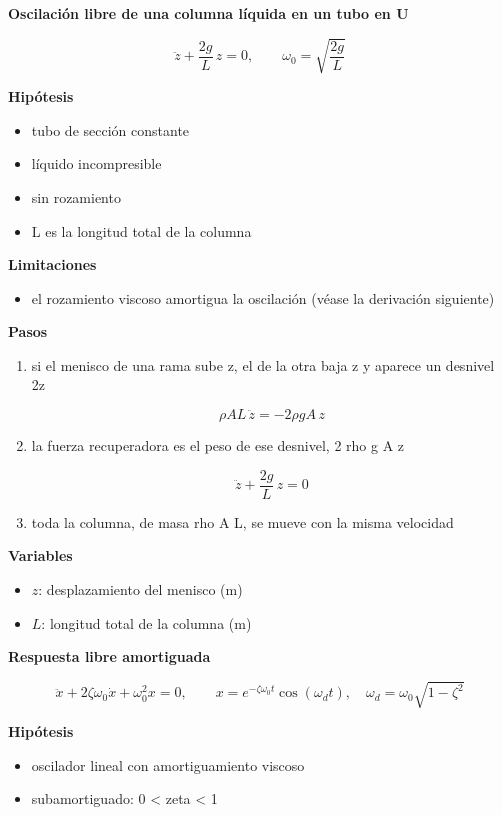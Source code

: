 \documentclass[10pt,openany]{book}
\begin{document}
\begin{tcolorbox}[title={Desarrollos del modelo}, studiumdef, breakable]

\noindent\textbf{Oscilación libre de una columna líquida en un tubo en U}

\[
\ddot z + \frac{2g}{L}\,z = 0,\qquad \omega_0 = \sqrt{\frac{2g}{L}}
\]

\noindent\textbf{Hipótesis}
\begin{itemize}
\item tubo de sección constante
\item líquido incompresible
\item sin rozamiento
\item L es la longitud total de la columna
\end{itemize}

\noindent\textbf{Limitaciones}
\begin{itemize}
\item el rozamiento viscoso amortigua la oscilación (véase la derivación siguiente)
\end{itemize}

\noindent\textbf{Pasos}
\begin{enumerate}
\item
si el menisco de una rama sube z, el de la otra baja z y aparece un desnivel 2z

\[
\rho A L\,\ddot z = -2\rho g A\,z
\]
\item
la fuerza recuperadora es el peso de ese desnivel, 2 rho g A z

\[
\ddot z + \frac{2g}{L}\,z = 0
\]
\item
toda la columna, de masa rho A L, se mueve con la misma velocidad
\end{enumerate}

\noindent\textbf{Variables}
\begin{itemize}
\item $z$: desplazamiento del menisco ($\mathrm{m}$)
\item $L$: longitud total de la columna ($\mathrm{m}$)
\end{itemize}



\noindent\textbf{Respuesta libre amortiguada}

\[
\ddot x + 2\zeta\omega_0\dot x + \omega_0^{2}x = 0,\qquad x = e^{-\zeta\omega_0 t}\cos(\omega_d t),\quad \omega_d = \omega_0\sqrt{1 - \zeta^{2}}
\]

\noindent\textbf{Hipótesis}
\begin{itemize}
\item oscilador lineal con amortiguamiento viscoso
\item subamortiguado: 0 < zeta < 1
\end{itemize}


\end{tcolorbox}
\end{document}
